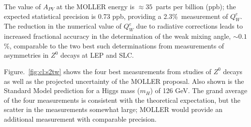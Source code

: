 The value of $A_{PV}$ at the MOLLER energy is 
$\approx 35$~parts per billion (ppb); the expected statistical precision is 0.73 ppb,
providing a 2.3\%\ measurement of $Q^e_W$. The reduction in the numerical value of $Q^e_W$ 
due to radiative corrections leads to increased fractional accuracy in the determination of the weak mixing
 angle, $\sim 0.1$\%, comparable to the two best such determinations from measurements of asymmetries in
$Z^0$ decays at LEP and SLC. 

Figure.~\ref{fig:cl:s2tw} shows
the four best measurements from studies of $Z^{0}$ decays~\cite{ref:cl:lepewwg}
as well as the projected uncertainty of the MOLLER proposal. Also shown
is the Standard Model prediction for a Higgs mass ($m_H$) of 126 GeV. The grand average of the
four measurements is consistent with the theoretical expectation, but the scatter in the measurements
somewhat large;  MOLLER would provide an additional measurement with comparable precision. 

